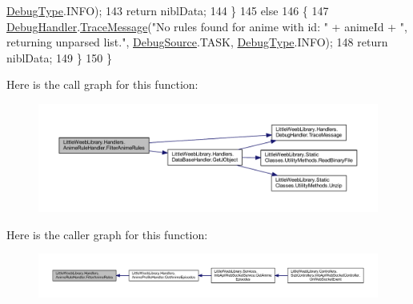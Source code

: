 \begin{DoxyCode}
      \mbox{\hyperlink{namespace_little_weeb_library_1_1_handlers_ab66019ed40462876ec4e61bb3ccb0a62}{DebugType}}.INFO);
143                 \textcolor{keywordflow}{return} niblData;
144             \}
145             \textcolor{keywordflow}{else}
146             \{
147                 \mbox{\hyperlink{class_little_weeb_library_1_1_handlers_1_1_anime_rule_handler_a6ad89134d97d818f3b2deebb7e2cf361}{DebugHandler}}.\mbox{\hyperlink{interface_little_weeb_library_1_1_handlers_1_1_i_debug_handler_a2e405bc3492e683cd3702fae125221bc}{TraceMessage}}(\textcolor{stringliteral}{"No rules found for anime with id: "} + 
      animeId + \textcolor{stringliteral}{", returning unparsed list."}, \mbox{\hyperlink{namespace_little_weeb_library_1_1_handlers_a2a6ca0775121c9c503d58aa254d292be}{DebugSource}}.TASK, \mbox{\hyperlink{namespace_little_weeb_library_1_1_handlers_ab66019ed40462876ec4e61bb3ccb0a62}{DebugType}}.INFO);
148                 \textcolor{keywordflow}{return} niblData;
149             \}
150         \}
\end{DoxyCode}
Here is the call graph for this function\+:\nopagebreak
\begin{figure}[H]
\begin{center}
\leavevmode
\includegraphics[width=350pt]{class_little_weeb_library_1_1_handlers_1_1_anime_rule_handler_a503fb2839489e1df8b80c9a461c0fd2b_cgraph}
\end{center}
\end{figure}
Here is the caller graph for this function\+:\nopagebreak
\begin{figure}[H]
\begin{center}
\leavevmode
\includegraphics[width=350pt]{class_little_weeb_library_1_1_handlers_1_1_anime_rule_handler_a503fb2839489e1df8b80c9a461c0fd2b_icgraph}
\end{center}
\end{figure}
\mbox{\label{class_little_weeb_library_1_1_handlers_1_1_anime_rule_handler_a719277ca087cc0e4b46708179d62b07f}} 
